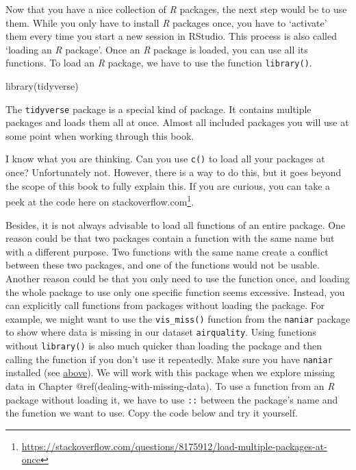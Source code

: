\documentclass[
  letterpaper,
]{krantz}
\makeatletter
\newenvironment{Shaded}{\begin{snugshade}}{\end{snugshade}}
\newcommand{\FunctionTok}[1]{\textcolor[rgb]{0.28,0.35,0.67}{#1}}
\newcommand{\NormalTok}[1]{\textcolor[rgb]{0.00,0.23,0.31}{#1}}
\renewcommand{\href}[2]{#2\footnote{\url{#1}}}
\newenvironment{kframe}{%
\medskip{}
\setlength{\fboxsep}{.8em}
 \def\at@end@of@kframe{}%
 \ifinner\ifhmode%
  \def\at@end@of@kframe{\end{minipage}}%
  \begin{minipage}{\columnwidth}%
 \fi\fi%
 \def\FrameCommand##1{\hskip\@totalleftmargin \hskip-\fboxsep
 \colorbox{shadecolor}{##1}\hskip-\fboxsep
     \hskip-\linewidth \hskip-\@totalleftmargin \hskip\columnwidth}%
 \MakeFramed {\advance\hsize-\width
   \@totalleftmargin\z@ \linewidth\hsize
   \@setminipage}}%
 {\par\unskip\endMakeFramed%
 \at@end@of@kframe}
\renewenvironment{Shaded}{\begin{kframe}}{\end{kframe}}
\makeatother
\begin{document}
Now that you have a nice collection of \emph{R} packages, the next step
would be to use them. While you only have to install \emph{R} packages
once, you have to `activate' them every time you start a new session in
RStudio. This process is also called `loading an \emph{R} package'. Once
an \emph{R} package is loaded, you can use all its functions. To load an
\emph{R} package, we have to use the function \texttt{library()}.

\begin{Shaded}
\begin{Highlighting}[]
\FunctionTok{library}\NormalTok{(tidyverse)}
\end{Highlighting}
\end{Shaded}

The \texttt{tidyverse} package is a special kind of package. It contains
multiple packages and loads them all at once. Almost all included
packages you will use at some point when working through this book.

I know what you are thinking. Can you use \texttt{c()} to load all your
packages at once? Unfortunately not. However, there is a way to do this,
but it goes beyond the scope of this book to fully explain this. If you
are curious, you can take a peek at the code
\href{https://stackoverflow.com/questions/8175912/load-multiple-packages-at-once}{here
on stackoverflow.com}.

Besides, it is not always advisable to load all functions of an entire
package. One reason could be that two packages contain a function with
the same name but with a different purpose. Two functions with the same
name create a conflict between these two packages, and one of the
functions would not be usable. Another reason could be that you only
need to use the function once, and loading the whole package to use only
one specific function seems excessive. Instead, you can explicitly call
functions from packages without loading the package. For example, we
might want to use the \texttt{vis\_miss()} function from the
\texttt{naniar} package to show where data is missing in our dataset
\texttt{airquality}. Using functions without \texttt{library()} is also
much quicker than loading the package and then calling the function if
you don't use it repeatedly. Make sure you have \texttt{naniar}
installed (see
\hyperref[install-packages-tidyverse-nanair-psych]{above}). We will work
with this package when we explore missing data in Chapter
@ref(dealing-with-missing-data). To use a function from an \emph{R}
package without loading it, we have to use \texttt{::} between the
package's name and the function we want to use. Copy the code below and
try it yourself.
\end{document}
